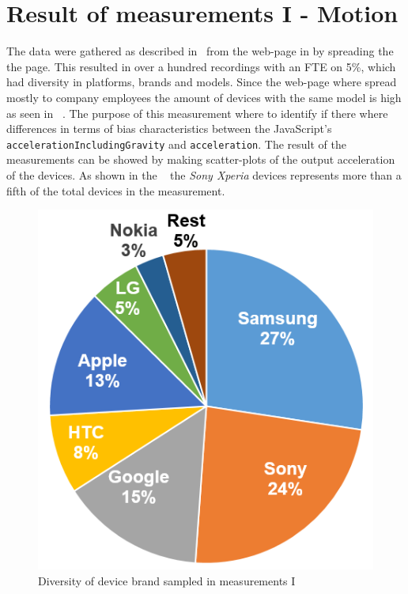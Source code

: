 \section{Result of measurements I  - Motion}\label{res:testI}
The data were gathered as described in~ from the web-page in  by spreading the the page. This resulted in over a hundred recordings with an FTE on 5\%, which had diversity in platforms, brands and models. Since the web-page where spread mostly to company employees the amount of devices with the same model is high as seen in ~.
The purpose of this measurement where to identify if there where differences in terms of bias characteristics between the JavaScript's \texttt{accelerationIncludingGravity} and \texttt{acceleration}. The result of the measurements can be showed by making scatter-plots of the output acceleration of the devices. As shown in the ~ the \textit{Sony Xperia} devices represents more than a fifth of the total devices in the measurement. 
\begin{figure}[H]
	\centering
	\includegraphics[scale=0.3]{img/measure1-brand}
	\caption{Diversity of device brand sampled in measurements I}
	\label{fig:measure1-brand}
\end{figure}
